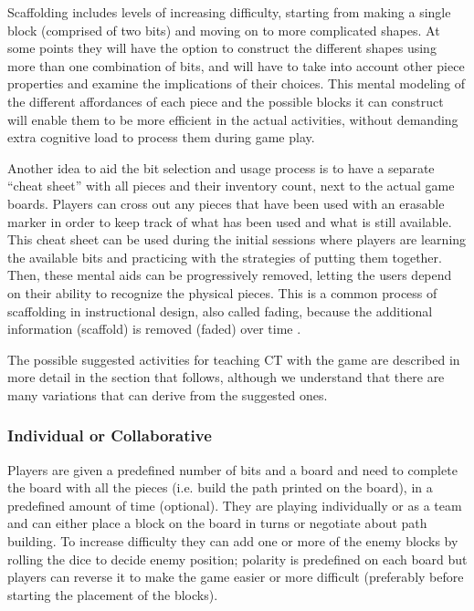 \documentclass{acm_proc_article-sp}
\begin{document}
Scaffolding includes levels of increasing difficulty, starting from making a single block (comprised of two bits) and moving on to more complicated shapes.
At some points they will have the option to construct the different shapes using more than one combination of bits, and will have to take into account other piece properties and examine the implications of their choices.
This mental modeling of the different affordances of each piece and the possible blocks it can construct will enable them to be more efficient in the actual activities, without demanding extra cognitive load to process them during game play. 

Another idea to aid the bit selection and usage process is to have a separate ``cheat sheet'' with all pieces and their inventory count, next to the actual game boards.
Players can cross out any pieces that have been used with an erasable marker in order to keep track of what has been used and what is still available.
This cheat sheet can be used during the initial sessions where players are learning the available bits and practicing with the strategies of putting them together.
Then, these mental aids can be progressively removed, letting the users depend on their ability to recognize the physical pieces.
This is a common process of scaffolding in instructional design, also called fading, because the additional information (scaffold) is removed (faded) over time \cite{driscoll2005psychology}.

The possible suggested activities for teaching CT with the game are described in more detail in the section that follows, although we understand that there are many variations that can derive from the suggested ones.

\subsubsection{Individual or Collaborative}
\label{sec:collaboration}
Players are given a predefined number of bits and a board and need to complete the board with all the pieces (i.e. build the path printed on the board), in a predefined amount of time (optional).
They are playing individually or as a team and can either place a block on the board in turns or negotiate about path building.
To increase difficulty they can add one or more of the enemy blocks by rolling the dice to decide enemy position; polarity is predefined on each board but players can reverse it to make the game easier or more difficult (preferably before starting the placement of the blocks).
\end{document}
